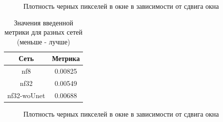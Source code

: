 \documentclass[a4paper]{article}
\begin{document}
		\begin{figure}
			\caption{Плотность черных пикселей в окне в зависимости от сдвига окна}
			\label{tr-1}
		\end{figure}
		\begin{table}
			\begin{center}
				\begin{tabular}{|c|c|}
					\hline
					Сеть & Метрика \\
					\hline
					nf8 & 0.00825\\
					\hline
					nf32 & 0.00549\\
					\hline
					nf32-woUnet & 0.00688\\
					\hline
				\end{tabular}
				\caption{Значения введенной метрики для разных сетей (меньше - лучше)}
				\label{table1}
			\end{center}
		\end{table}
		\begin{figure}
			\caption{Плотность черных пикселей в окне в зависимости от сдвига окна}
			\label{tr-2}
		\end{figure}
\end{document}
